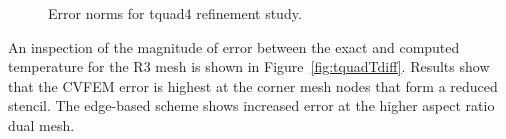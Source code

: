 \begin{figure}
  \centering
  \vspace{0.1in}
  \caption{Error norms for tquad4 refinement study.}
  \label{fig:laplaceTquad}
\end{figure}

An inspection of the magnitude of error between the exact and computed temperature for the R3 mesh is shown in Figure~\ref{fig:tquadTdiff}.
Results show that the CVFEM error is highest at the corner mesh nodes that form a reduced stencil. The edge-based scheme shows increased error
at the higher aspect ratio dual mesh. 

